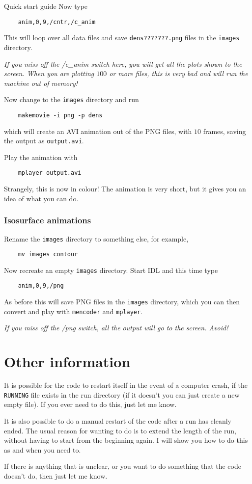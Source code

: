 \begin{chapter}{\label{cha:quickstart} Quick start guide}
  Now type
  \begin{Verbatim}
    anim,0,9,/cntr,/c_anim
  \end{Verbatim}
  This will loop over all data files and save \verb"dens???????.png" files in
  the \verb"images" directory.

  \emph{If you miss off the /c\_anim switch here, you will get all the
  plots shown to the screen.  When you are plotting $100$ or more files, this
  is very bad and will run the machine out of memory!}

  Now change to the \verb"images" directory and run
  \begin{Verbatim}
    makemovie -i png -p dens
  \end{Verbatim}
  which will create an AVI animation out of the PNG files, with $10$ frames,
  saving the output as \verb"output.avi".

  Play the animation with
  \begin{Verbatim}
    mplayer output.avi
  \end{Verbatim}
  Strangely, this is now in colour!  The animation is very short, but it gives
  you an idea of what you can do.

  \subsubsection{Isosurface animations}
  Rename the \verb"images" directory to something else, for example,
  \begin{Verbatim}
    mv images contour
  \end{Verbatim}
  Now recreate an empty \verb"images" directory.  Start IDL and this time type
  \begin{Verbatim}
    anim,0,9,/png
  \end{Verbatim}
  As before this will save PNG files in the \verb"images" directory, which you
  can then convert and play with \verb"mencoder" and \verb"mplayer".

  \emph{If you miss off the /png switch, all the output will go to the screen.
  Avoid!}

  \section{Other information}
  It is possible for the code to restart itself in the event of a computer
  crash, if the \verb"RUNNING" file exists in the run directory (if it doesn't
  you can just create a new empty file).  If you ever need to do this, just let
  me know.

  It is also possible to do a manual restart of the code after a run has
  cleanly ended.  The usual reason for wanting to do is to extend the length of
  the run, without having to start from the beginning again.  I will show you
  how to do this as and when you need to.

  If there is anything that is unclear, or you want to do something that the
  code doesn't do, then just let me know.
\end{chapter}
